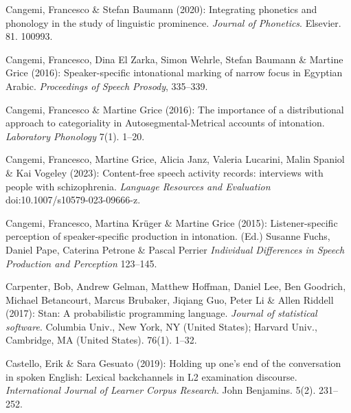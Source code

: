 \begin{styleBibliography}
Cangemi, Francesco \& Stefan Baumann (2020): Integrating phonetics and phonology in the study of linguistic prominence. \textit{Journal of Phonetics}. Elsevier. 81. 100993.
\end{styleBibliography}

\begin{styleBibliography}
Cangemi, Francesco, Dina El Zarka, Simon Wehrle, Stefan Baumann \& Martine Grice (2016): Speaker-specific intonational marking of narrow focus in Egyptian Arabic. \textit{Proceedings of Speech Prosody}, 335–339.
\end{styleBibliography}

\begin{styleBibliography}
Cangemi, Francesco \& Martine Grice (2016): The importance of a distributional approach to categoriality in Autosegmental-Metrical accounts of intonation. \textit{Laboratory Phonology} 7(1). 1–20.
\end{styleBibliography}

\begin{styleBibliography}
Cangemi, Francesco, Martine Grice, Alicia Janz, Valeria Lucarini, Malin Spaniol \& Kai Vogeley (2023): Content-free speech activity records: interviews with people with schizophrenia. \textit{Language Resources and Evaluation} doi:10.1007/s10579-023-09666-z.
\end{styleBibliography}

\begin{styleBibliography}
Cangemi, Francesco, Martina Krüger \& Martine Grice (2015): Listener-specific perception of speaker-specific production in intonation. (Ed.) Susanne Fuchs, Daniel Pape, Caterina Petrone \& Pascal Perrier \textit{Individual Differences in Speech Production and Perception} 123–145.
\end{styleBibliography}

\begin{styleBibliography}
Carpenter, Bob, Andrew Gelman, Matthew Hoffman, Daniel Lee, Ben Goodrich, Michael Betancourt, Marcus Brubaker, Jiqiang Guo, Peter Li \& Allen Riddell (2017): Stan: A probabilistic programming language. \textit{Journal of statistical software}. Columbia Univ., New York, NY (United States); Harvard Univ., Cambridge, MA (United States). 76(1). 1–32.
\end{styleBibliography}

\begin{styleBibliography}
Castello, Erik \& Sara Gesuato (2019): Holding up one’s end of the conversation in spoken English: Lexical backchannels in L2 examination discourse. \textit{International Journal of Learner Corpus Research}. John Benjamins. 5(2). 231–252.
\end{styleBibliography}

